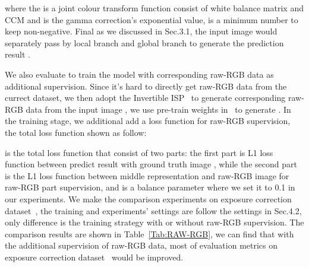 \documentclass{bmvc2k}
\begin{document}
where the  is a joint colour transform function consist of white balance matrix and CCM and  is the gamma correction's exponential value,  is a minimum number to keep non-negative. Final as we discussed in Sec.3.1, the input image  would separately pass by local branch  and global branch  to generate the prediction result .

\vspace{1mm}

We also evaluate to train the model with corresponding raw-RGB data as additional supervision. Since it's hard to directly get raw-RGB data from the currect dataset, we then adopt the Invertible ISP~\cite{xing21invertible} to generate corresponding raw-RGB data  from the input image , we use pre-train weights in~\cite{xing21invertible}  to generate . In the training stage, we additional add a loss function  for raw-RGB supervision, the total loss function shown as follow:



 is the total loss function that consist of two parts: the first part  is L1 loss function between predict result  with ground truth image , while the second part  is the L1 loss function between middle representation  and raw-RGB image  for raw-RGB part supervision, and  is a balance parameter where we set it to 0.1 in our experiments. We make the comparison experiments on exposure correction dataset~\cite{Exposure_2021_CVPR}, the training and experiments’ settings are follow the settings in Sec.4.2, only difference is the training strategy with or without raw-RGB supervision. The comparison results are shown in Table~\ref{Tab:RAW-RGB}, we can find that with the additional supervision of raw-RGB data, most of evaluation metrics on exposure correction dataset~\cite{Exposure_2021_CVPR} would be improved.
\end{document}
